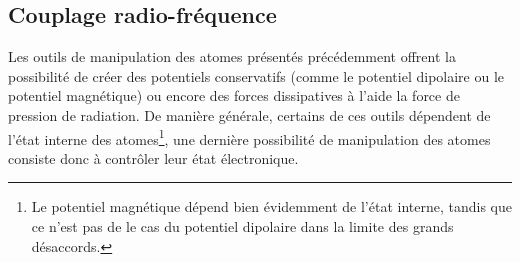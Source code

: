 \subsection{Couplage radio-fréquence} 
Les outils de manipulation des atomes présentés précédemment offrent la possibilité de créer des potentiels conservatifs (comme le potentiel dipolaire ou le potentiel magnétique) ou encore des forces dissipatives à l'aide la force de pression de radiation. De manière générale, certains de ces outils dépendent de l'état interne des atomes\footnote{Le potentiel magnétique dépend bien évidemment de l'état interne, tandis que ce n'est pas de le cas du potentiel dipolaire dans la limite des grands désaccords.}, une dernière possibilité de manipulation des atomes consiste donc à contrôler leur état électronique.%

